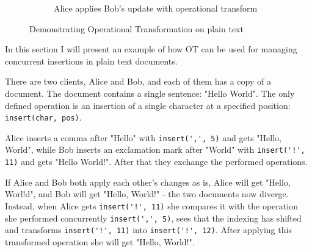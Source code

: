 \documentclass[a4paper, 11pt, oneside]{article}
\theoremstyle{definition}
\begin{document}
\begin{figure}
    \vspace{5mm}

    \begin{subfigure}{\linewidth}
        \centering
        \caption{Alice applies Bob's update with operational transform}
        \label{fig:ot}
    \end{subfigure}
    \caption{Demonstrating Operational Transformation on plain text}
\end{figure}

In this section I will present an example of how OT can be used for managing concurrent insertions in plain text documents.

There are two clients, Alice and Bob, and each of them has a copy of a document. The document contains a single sentence: "Hello World". The only defined operation is an insertion of a single character at a specified position: \verb|insert(char, pos)|.


Alice inserts a comma after "Hello" with \verb|insert(',', 5)| and gets "Hello, World", while Bob inserts an exclamation mark after "World" with \verb|insert('!', 11)| and gets "Hello World!". After that they exchange the performed operations.

If Alice and Bob both apply each other's changes as is, Alice will get "Hello, Worl!d", and Bob will get "Hello, World!" - the two documents now diverge. Instead, when Alice gets \verb|insert('!', 11)| she compares it with the operation she performed concurrently \verb|insert(',', 5)|, sees that the indexing has shifted and transforms \verb|insert('!', 11)| into \verb|insert('!', 12)|. After applying this transformed operation she will get "Hello, World!". 
\end{document}
